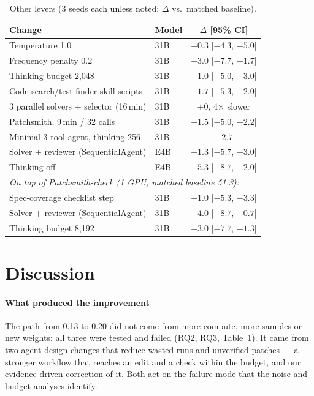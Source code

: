 \documentclass[conference]{IEEEtran}
\begin{document}
\begin{table}[t]
\centering
\caption{Other levers (3 seeds each unless noted; $\Delta$ vs.\ matched baseline).}
\label{tab:neg}
\setlength{\tabcolsep}{3pt}
\begin{tabular}{llc}
\toprule
Change & Model & $\Delta$ [95\% CI]\\
\midrule
Temperature 1.0 & 31B & $+0.3$ [$-4.3$, $+5.0$]\\
Frequency penalty 0.2 & 31B & $-3.0$ [$-7.7$, $+1.7$]\\
Thinking budget 2,048 & 31B & $-1.0$ [$-5.0$, $+3.0$]\\
Code-search/test-finder skill scripts & 31B & $-1.7$ [$-5.3$, $+2.0$]\\
3 parallel solvers + selector (16\,min) & 31B & $\pm0$, 4$\times$ slower\\
Patchsmith, 9\,min / 32 calls & 31B & $-1.5$ [$-5.0$, $+2.2$]\\
Minimal 3-tool agent, thinking 256 & 31B & $-2.7$\\
Solver + reviewer (SequentialAgent) & E4B & $-1.3$ [$-5.7$, $+3.0$]\\
Thinking off & E4B & $-5.3$ [$-8.7$, $-2.0$]\\
\midrule
\multicolumn{3}{l}{\emph{On top of Patchsmith-check (1 GPU, matched baseline 51.3):}}\\
Spec-coverage checklist step & 31B & $-1.0$ [$-5.3$, $+3.3$]\\
Solver + reviewer (SequentialAgent) & 31B & $-4.0$ [$-8.7$, $+0.7$]\\
Thinking budget 8,192 & 31B & $-3.0$ [$-7.7$, $+1.3$]\\
\bottomrule
\end{tabular}
\end{table}

\section{Discussion}
\paragraph*{What produced the improvement} The path from 0.13 to 0.20 did not come from more compute, more samples or new weights: all three were tested and failed (RQ2, RQ3, Table~\ref{tab:neg}). It came from two agent-design changes that reduce wasted runs and unverified patches --- a stronger workflow that reaches an edit and a check within the budget, and our evidence-driven correction of it. Both act on the failure mode that the noise and budget analyses identify.
\end{document}
